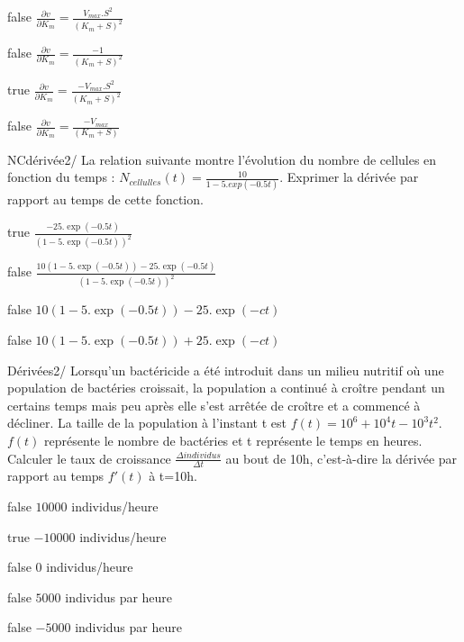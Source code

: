 \documentclass[11pt]{article}
\begin{document}
            \begin{reponses}
            	\item[false]  $\frac{\partial v}{\partial K_m} = \frac{V_{max}.S^2}{(K_m+S)^2}$
            	\item[false]   $\frac{\partial v}{\partial K_m} = \frac{-1}{(K_m+S)^2}$
                \item[true]  $\frac{\partial v}{\partial K_m} = \frac{-V_{max}.S^2}{(K_m+S)^2}$
                \item[false]  $\frac{\partial v}{\partial K_m} = \frac{-V_{max}}{(K_m+S)}$
            \end{reponses}
			
				\begin{question}{NC}{dérivée}{2}{/} 
				La relation suivante montre l'évolution du nombre de cellules en fonction du temps : $N_{cellulles}(t)=\frac{10}{1-5.exp(-0.5t)}$. Exprimer la dérivée par rapport au temps de cette fonction.

            \end{question}

            \begin{reponses}
            	\item[true]   $\frac{-25.\exp(-0.5t)}{(1-5.\exp(-0.5t))^{2}}$ 
            	\item[false]  $\frac{10(1-5.\exp(-0.5t))-25.\exp(-0.5t)}{(1-5.\exp(-0.5t))^{2}}$
                \item[false]  ${10(1-5.\exp(-0.5t))-25.\exp(-ct)}$ 
                \item[false]   ${10(1-5.\exp(-0.5t))+25.\exp(-ct)}$
            \end{reponses}
			
			
			\begin{question}{22}{Dérivées}{2}{/}
			  Lorsqu'un bactéricide a été introduit dans un milieu nutritif où une population de bactéries croissait, la population a continué à croître pendant un certains temps mais peu après elle s'est arrêtée de croître et a commencé à décliner. La taille de la population à l'instant t est $f(t) = 10^6 + 10^4 t - 10^3 t^2$. $f(t)$ représente le nombre de bactéries et t représente le temps en heures. Calculer le taux de croissance $\frac{\Delta individus}{\Delta t}$ au bout de 10h, c'est-à-dire la dérivée par rapport au temps $f'(t)$ à t=10h.
            \end{question}

            \begin{reponses}
            	\item[false] $10000$ individus/heure
            	\item[true]  $-10000$ individus/heure
                \item[false]   $0$ individus/heure
                \item[false] $5000$ individus par heure
                \item[false] $-5000$ individus par heure
            \end{reponses}
			
\end{document}
